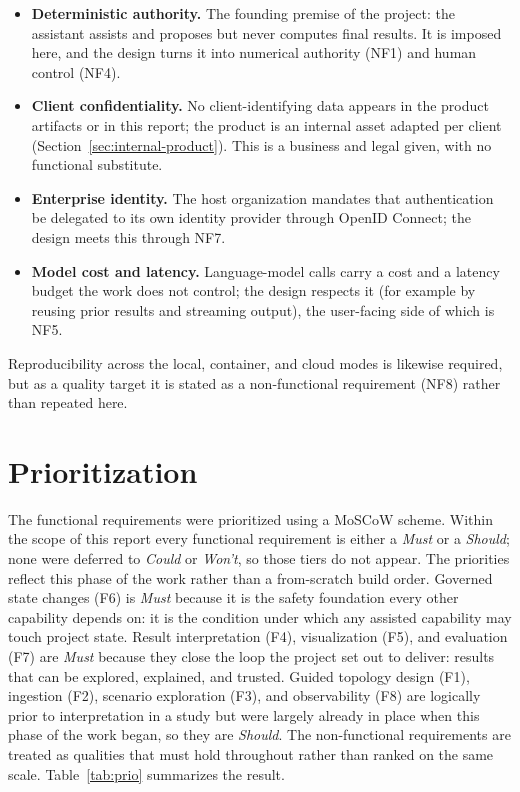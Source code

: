 \begin{itemize}
  \item \textbf{Deterministic authority.} The founding premise of the project: the
    assistant assists and proposes but never computes final results. It is imposed
    here, and the design turns it into numerical authority (NF1) and human control
    (NF4).
  \item \textbf{Client confidentiality.} No client-identifying data appears in the
    product artifacts or in this report; the product is an internal asset adapted
    per client (Section~\ref{sec:internal-product}). This is a business and legal
    given, with no functional substitute.
  \item \textbf{Enterprise identity.} The host organization mandates that
    authentication be delegated to its own identity provider through OpenID
    Connect; the design meets this through NF7.
  \item \textbf{Model cost and latency.} Language-model calls carry a cost and a
    latency budget the work does not control; the design respects it (for example
    by reusing prior results and streaming output), the user-facing side of which
    is NF5.
\end{itemize}

Reproducibility across the local, container, and cloud modes is likewise required,
but as a quality target it is stated as a non-functional requirement (NF8) rather
than repeated here.

\section{Prioritization}
\label{sec:prioritization}

The functional requirements were prioritized using a MoSCoW scheme. Within the
scope of this report every functional requirement is either a \emph{Must} or a
\emph{Should}; none were deferred to \emph{Could} or \emph{Won't}, so those tiers
do not appear. The priorities reflect this phase of the work rather than a
from-scratch build order. Governed state changes
(F6) is \emph{Must} because it is the safety foundation every other capability
depends on: it is the condition under
which any assisted capability may touch project state. Result interpretation
(F4), visualization (F5), and evaluation (F7) are \emph{Must} because they close
the loop the project set out to deliver: results that can be explored, explained,
and trusted. Guided topology design (F1), ingestion (F2), scenario exploration
(F3), and observability (F8) are logically prior to interpretation in a study but
were largely already in place when this phase of the work began, so they are
\emph{Should}. The non-functional
requirements are treated as qualities that must hold throughout rather than ranked
on the same scale. Table~\ref{tab:prio} summarizes the result.

